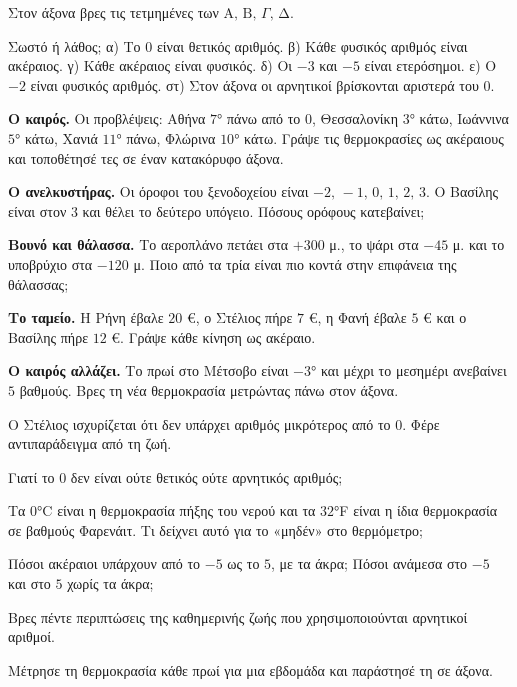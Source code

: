 \ex Στον άξονα βρες τις τετμημένες των $\mathrm{Α},\,\mathrm{Β},\,\Gamma,\,\mathrm{Δ}$.
\begin{center}
\end{center}

\ex Σωστό ή λάθος; α) Το $0$ είναι θετικός αριθμός. \quad β) Κάθε φυσικός αριθμός είναι ακέραιος. \quad γ) Κάθε ακέραιος είναι φυσικός. \quad δ) Οι $-3$ και $-5$ είναι ετερόσημοι. \quad ε) Ο $-2$ είναι φυσικός αριθμός. \quad στ) Στον άξονα οι αρνητικοί βρίσκονται αριστερά του $0$.


\ex \textbf{Ο καιρός.} Οι προβλέψεις: Αθήνα $7$° πάνω από το $0$, Θεσσαλονίκη $3$° κάτω, Ιωάννινα $5$° κάτω, Χανιά $11$° πάνω, Φλώρινα $10$° κάτω. Γράψε τις θερμοκρασίες ως ακέραιους και τοποθέτησέ τες σε έναν κατακόρυφο άξονα.

\ex \textbf{Ο ανελκυστήρας.} Οι όροφοι του ξενοδοχείου είναι $-2,\,-1,\,0,\,1,\,2,\,3$. Ο Βασίλης είναι στον $3$ και θέλει το δεύτερο υπόγειο. Πόσους ορόφους κατεβαίνει;

\ex \textbf{Βουνό και θάλασσα.} Το αεροπλάνο πετάει στα $+300$ μ., το ψάρι στα $-45$ μ. και το υποβρύχιο στα $-120$ μ. Ποιο από τα τρία είναι πιο κοντά στην επιφάνεια της θάλασσας;

\ex \textbf{Το ταμείο.} Η Ρήνη έβαλε $20$ €, ο Στέλιος πήρε $7$ €, η Φανή έβαλε $5$ € και ο Βασίλης πήρε $12$ €. Γράψε κάθε κίνηση ως ακέραιο.

\ex \textbf{Ο καιρός αλλάζει.} Το πρωί στο Μέτσοβο είναι $-3$° και μέχρι το μεσημέρι ανεβαίνει $5$ βαθμούς. Βρες τη νέα θερμοκρασία μετρώντας πάνω στον άξονα.


\ex Ο Στέλιος ισχυρίζεται ότι δεν υπάρχει αριθμός μικρότερος από το $0$. Φέρε αντιπαράδειγμα από τη ζωή.

\ex Γιατί το $0$ δεν είναι ούτε θετικός ούτε αρνητικός αριθμός;

\ex Τα $0$°C είναι η θερμοκρασία πήξης του νερού και τα $32$°F είναι η ίδια θερμοκρασία σε βαθμούς Φαρενάιτ. Τι δείχνει αυτό για το «μηδέν» στο θερμόμετρο;

\ex Πόσοι ακέραιοι υπάρχουν από το $-5$ ως το $5$, με τα άκρα; Πόσοι ανάμεσα στο $-5$ και στο $5$ χωρίς τα άκρα;


\ex Βρες πέντε περιπτώσεις της καθημερινής ζωής που χρησιμοποιούνται αρνητικοί αριθμοί.

\ex Μέτρησε τη θερμοκρασία κάθε πρωί για μια εβδομάδα και παράστησέ τη σε άξονα.
